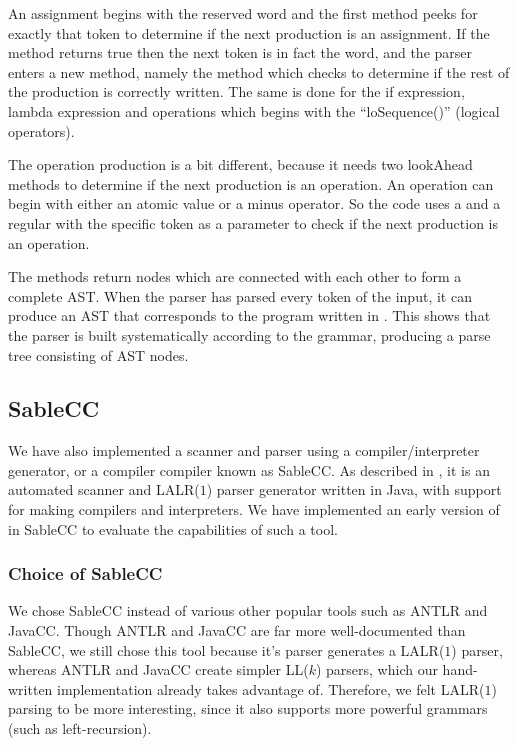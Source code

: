 An assignment begins with the reserved word  and the first
 method peeks for exactly that token to determine
if the next production is an assignment. If the method returns true then
the next token is in fact the  word, and the parser enters a
new method, namely the  method which checks to
determine if the rest of the production is correctly written. The same
is done for the if expression, lambda expression and operations which
begins with the ``loSequence()'' (logical operators).

The operation production is a bit different, because it needs two lookAhead
methods to determine if the next production is an operation. An operation can
begin with either an atomic value or a minus operator. So the code uses a
 and a regular  with the
specific token as a parameter to check if the next production is an operation.

The methods return nodes which are connected with each other to form
a complete AST\@. When the parser has parsed every token of the input,
it can produce an AST that corresponds to the program written in
\productname{}. This shows that the parser is built systematically
according to the grammar, producing a parse tree consisting of AST
nodes.

\subsection{SableCC}
We have also implemented a scanner and parser using a
compiler/interpreter generator, or a compiler compiler
known as SableCC\cite{sableccdoc}. As described in
, it is an automated scanner and
LALR($1$) parser generator written in Java, with support for making
compilers and interpreters. We have implemented an early version of
\productname{} in SableCC to evaluate the capabilities of such a tool.

\subsubsection{Choice of SableCC}
We chose SableCC instead of various other popular tools such as
ANTLR\cite{antlr} and JavaCC\cite{javacc}. Though ANTLR and JavaCC are far more
well-documented than SableCC, we still chose this tool because it's parser
generates a LALR($1$) parser, whereas ANTLR and JavaCC create simpler
LL($k$) parsers, which our hand-written implementation already takes advantage of.
Therefore, we felt LALR($1$) parsing to be more interesting, since it
also supports more powerful grammars (such as left-recursion).

